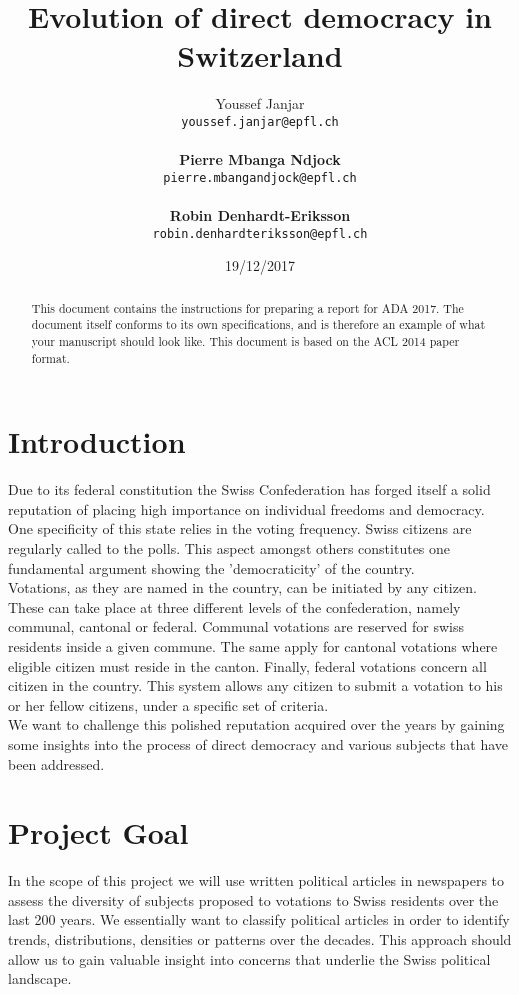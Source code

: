 \documentclass[11pt]{article}
\title{Evolution of direct democracy in Switzerland}
\author{Youssef Janjar \\
  {\tt youssef.janjar@epfl.ch} \\\\
  \textbf{Pierre Mbanga Ndjock} \\
  {\tt pierre.mbangandjock@epfl.ch} \\\\
\textbf{Robin Denhardt-Eriksson} \\
{\tt robin.denhardteriksson@epfl.ch} \\}
\date{19/12/2017}
\begin{document}
\maketitle
\begin{abstract}
  This document contains the instructions for preparing a report for ADA 2017. The document itself conforms to its own specifications, and is therefore an example of
  what your manuscript should look like. This document is based on the ACL 2014 paper format.
\end{abstract}

\bigskip

\section{Introduction}

Due to its federal constitution the Swiss Confederation has forged itself
a solid reputation of placing high importance on individual freedoms and democracy.
One specificity of this state relies in the voting frequency.
Swiss citizens are regularly called to the polls. This aspect amongst others constitutes one fundamental
argument showing the 'democraticity' of the country.
\\
Votations, as they are named in the country, can be initiated by any citizen. These can take place at
three different levels of the confederation, namely communal, cantonal or federal. Communal votations
are reserved for swiss residents inside a given commune. The same apply for cantonal votations where eligible citizen
must reside in the canton. Finally, federal votations concern all citizen in the country. This system
allows any citizen to submit a votation to his or her fellow citizens, under a specific set of criteria.
\\
We want to challenge this polished reputation acquired over the years by gaining some insights into the
process of direct democracy and various
subjects that have been addressed.

\section{Project Goal}

In the scope of this project we will use written political articles in newspapers to assess
the diversity of subjects proposed to votations to Swiss residents over the last 200 years. We essentially
want to classify political articles in order to identify trends, distributions, densities or patterns
over the decades. This approach should allow us to gain valuable insight into concerns that underlie
the Swiss political landscape.
\end{document}
